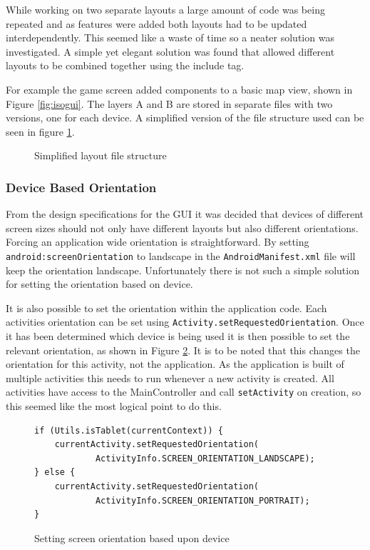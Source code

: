 While working on two separate layouts a large amount of code was being repeated and as features were added both layouts had to be updated interdependently. This seemed like a waste of time so a neater solution was investigated. A simple yet elegant solution was found that allowed different layouts to be combined together using the include tag.

For example the game screen added components to a basic map view, shown in Figure \ref{fig:isogui}. The layers A and B are stored in separate files with two versions, one for each device. A simplified version of the file structure used can be seen in figure \ref{fig:fs}.

\begin{figure}[H]
\caption{Simplified layout file structure}
\label{fig:fs}
\end{figure}

\subsubsection*{Device Based Orientation}
From the design specifications for the GUI it was decided that devices of different screen sizes should not only have different layouts but also different orientations. Forcing an application wide orientation is straightforward. By setting \verb|android:screenOrientation| to landscape in the \verb|AndroidManifest.xml| file will keep the orientation landscape. Unfortunately there is not such a simple solution for setting the orientation based on device.

It is also possible to set the orientation within the application code. Each activities orientation can be set using \verb|Activity.setRequestedOrientation|. Once it has been determined which device is being used it is then possible to set the relevant orientation, as shown in Figure \ref{fig:orientation}. It is to be noted that this changes the orientation for this activity, not the application. As the application is built of multiple activities this needs to run whenever a new activity is created. All activities have access to the MainController and call \verb|setActivity| on creation, so this seemed like the most logical point to do this.

\begin{figure}[H]
\begin{verbatim}
if (Utils.isTablet(currentContext)) {
    currentActivity.setRequestedOrientation(
            ActivityInfo.SCREEN_ORIENTATION_LANDSCAPE);
} else {
    currentActivity.setRequestedOrientation(
            ActivityInfo.SCREEN_ORIENTATION_PORTRAIT);
}
\end{verbatim}
\caption{Setting screen orientation based upon device}
\label{fig:orientation}
\end{figure}

